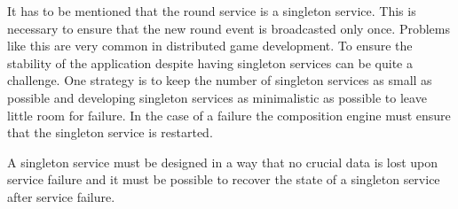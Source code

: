 It has to be mentioned that the round service is a singleton service. This is
necessary to ensure that the new round event is broadcasted only once. Problems
like this are very common in distributed game development. To ensure the
stability of the application despite having singleton services can be quite a
challenge. One strategy is to keep the number of singleton services as small as
possible and developing singleton services as minimalistic as possible to leave
little room for failure. In the case of a failure the composition engine must
ensure that the singleton service is restarted.

A singleton service must be designed in a way that no crucial data is lost upon
service failure and it must be possible to recover the state of a singleton
service after service failure.



